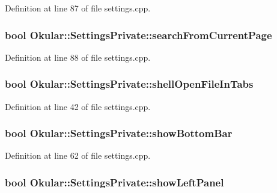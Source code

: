 Definition at line 87 of file settings.\+cpp.

\hypertarget{classOkular_1_1SettingsPrivate_a79e1f0ced04bb9073d77c1e442aebc8f}{
\subsubsection[{search\+From\+Current\+Page}]{\setlength{\rightskip}{0pt plus 5cm}bool Okular\+::\+Settings\+Private\+::search\+From\+Current\+Page}}\label{classOkular_1_1SettingsPrivate_a79e1f0ced04bb9073d77c1e442aebc8f}


Definition at line 88 of file settings.\+cpp.

\hypertarget{classOkular_1_1SettingsPrivate_ac73c4b9cc99b0dc6db98a6904d7640c9}{
\subsubsection[{shell\+Open\+File\+In\+Tabs}]{\setlength{\rightskip}{0pt plus 5cm}bool Okular\+::\+Settings\+Private\+::shell\+Open\+File\+In\+Tabs}}\label{classOkular_1_1SettingsPrivate_ac73c4b9cc99b0dc6db98a6904d7640c9}


Definition at line 42 of file settings.\+cpp.

\hypertarget{classOkular_1_1SettingsPrivate_a9aa0a34dc52345d31430cb93ebb23b73}{
\subsubsection[{show\+Bottom\+Bar}]{\setlength{\rightskip}{0pt plus 5cm}bool Okular\+::\+Settings\+Private\+::show\+Bottom\+Bar}}\label{classOkular_1_1SettingsPrivate_a9aa0a34dc52345d31430cb93ebb23b73}


Definition at line 62 of file settings.\+cpp.

\hypertarget{classOkular_1_1SettingsPrivate_afbeeb8fbbad4a37e416e6c716c75ea03}{
\subsubsection[{show\+Left\+Panel}]{\setlength{\rightskip}{0pt plus 5cm}bool Okular\+::\+Settings\+Private\+::show\+Left\+Panel}}\label{classOkular_1_1SettingsPrivate_afbeeb8fbbad4a37e416e6c716c75ea03}


